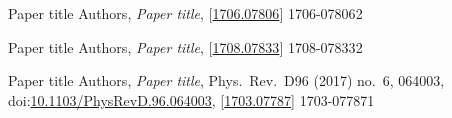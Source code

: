 \documentclass[12pt,english,pdftex,a4paper]{book}
\begin{document}
{}
\renewcommand{\ThumbBoxColor}{black}


  {Paper title}
  {Authors,
    \emph{Paper title}, 
    [\href{https://arxiv.org/abs/1706.07806}{1706.07806}]}
  {1706-07806}{2}{  \fi}
\label{art:A} %

\renewcommand{\PaperSubFolioFontSize}{10}
\setcounter{PaperSubFolio}{0}

\ifSpaper
\else
\fi


  {Paper title}
  {Authors, 
    \emph{Paper title}, 
    [\href{https://arxiv.org/abs/1708.07833}{1708.07833}]}
  {1708-07833}{2}{  \fi}
\label{art:B}

\renewcommand{\PaperSubFolioFontSize}{10}
\setcounter{PaperSubFolio}{0}

\ifSpaper
\else
\fi


  {Paper title}
  {Authors,
    \emph{Paper title}, 
    Phys.~Rev.~D96 (2017) no.~6, 064003, 
    doi:\href{http://doi.org/10.1103/PhysRevD.96.064003}
    {10.1103/PhysRevD.96.064003}, 
    [\href{https://arxiv.org/abs/1703.07787}{1703.07787}]}
  {1703-07787}{1}{  \fi}
\label{art:C}

\renewcommand{\PaperSubFolioFontSize}{9}
\setcounter{PaperSubFolio}{1}

\ifSpaper
\else
\fi


\pagestyle{empty}
\end{document}
